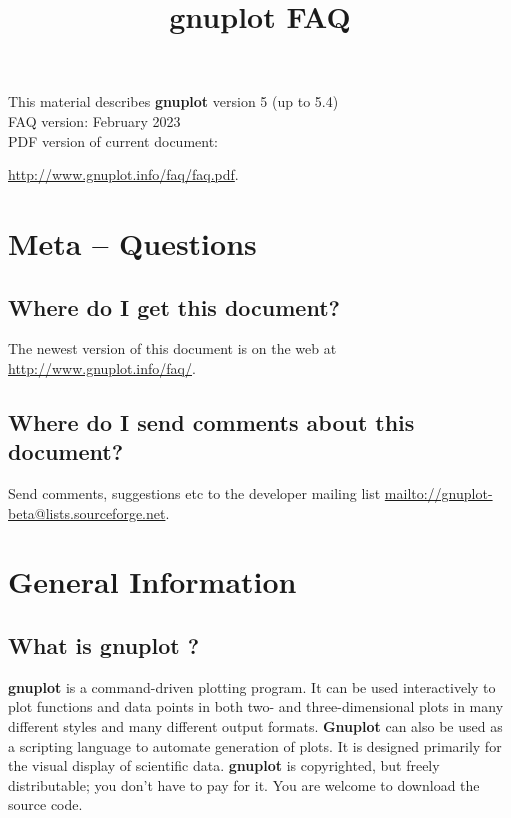 \documentclass[letter,11pt]{article}
\def\http#1{{\small\href{http://#1}{\url{http://#1}}}}
\def\mailto#1{{\small\href{mailto://#1}{\url{mailto://#1}}}}
\newcommand{\mailto}[1]%
            {\htmladdnormallink{\latex{\url{<#1>}}\html{\textit{#1}}}%
                {mailto:#1}%
            }
\newcommand{\http}[1]%
            {\htmladdnormallink{\latex{\url{http://#1}}%
                    \html{\textit{http://#1}}}%
                {http://#1}%
            }
\newcommand{\gnuplot}{\textbf{gnuplot }}
\newcommand{\Gnuplot}{\textbf{Gnuplot }}
\begin{document}
\title{\gnuplot FAQ}
\author{}
\date{}
\maketitle

\noindent
This material describes \gnuplot version 5 (up to 5.4)
        \\
FAQ version: February 2023
        \\
PDF version of current document: {\http{www.gnuplot.info/faq/faq.pdf}.


\tableofcontents

\newpage
\setcounter{section}{-1}
\section{Meta -- Questions}

\subsection{Where do I get this document?}

The newest version of this document is on the web at
\http{www.gnuplot.info/faq/}.

\subsection{Where do I send comments about this document?}

Send comments, suggestions etc to the developer mailing list
\mailto{gnuplot-beta@lists.sourceforge.net}.

\section{General Information}

\subsection{What is \gnuplot?}

\gnuplot is a command-driven plotting program.
It can be used interactively to plot functions and data points in
both two- and three-dimensional plots in many different styles and
many different output formats.  \Gnuplot can also be used as a
scripting language to automate generation of plots.
It is designed primarily for the visual display of scientific data.
\gnuplot is copyrighted, but freely distributable;
you don't have to pay for it. You are welcome to download the source code.


}
\end{document}
